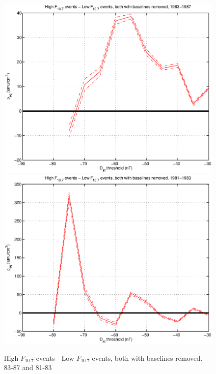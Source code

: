 \documentclass[10pt,twocolumn]{article}
\begin{document}
\begin{figure}[htp!]
\includegraphics[scale=0.45]{paperfigures/DstRhoThresh-1983-1987.eps}
\includegraphics[scale=0.45]{paperfigures/DstRhoThresh-1981-1983.eps}
\caption{High $F_{10.7}$ events - Low $F_{10.7}$ events, both with baselines removed. 83-87 and 81-83}
\end{figure}
\end{document}
